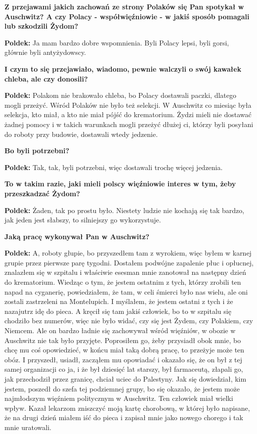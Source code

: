 \begin{otherlanguage}{polish}
\sloppy 
\textbf{Z przejawami jakich zachowań ze strony Polaków się Pan spotykał w Auschwitz? A czy Polacy - współwięźniowie - w jakiś sposób pomagali lub szkodzili Żydom?}

\textbf{Poldek:} Ja mam bardzo dobre wspomnienia. Byli Polacy lepsi, byli gorsi, głównie byli antyżydowscy.

\textbf{I czym to się przejawiało, wiadomo, pewnie walczyli o swój kawałek chleba, ale czy donosili?}
  
\textbf{Poldek:} Polakom nie brakowało chleba, bo Polacy dostawali paczki, dlatego mogli przeżyć. Wśród Polaków nie było też selekcji. W Auschwitz co miesiąc była selekcja, kto miał, a kto nie miał pójść do krematorium. Żydzi mieli nie dostawać żadnej pomocy i w takich warunkach mogli przeżyć dłużej ci, którzy byli posyłani do roboty przy budowie, dostawali wtedy jedzenie.

\textbf{Bo byli potrzebni?}

\textbf{Poldek:} Tak, tak, byli potrzebni, więc dostawali trochę więcej jedzenia. 

\textbf{To w takim razie, jaki mieli polscy więźniowie interes w tym, żeby przeszkadzać Żydom?}

\textbf{Poldek:} Żaden, tak po prostu było. Niestety ludzie nie kochają się tak bardzo, jak jeden jest słabszy, to silniejszy go wykorzystuje.

\textbf{Jaką pracę wykonywał Pan w Auschwitz?}
 
\textbf{Poldek:} A, roboty głupie, bo przyszedłem tam z wyrokiem, więc byłem w karnej grupie przez pierwsze parę tygodni. Dostałem podwójne zapalenie płuc i opłucnej, znalazłem się w szpitalu i właściwie esesman mnie zanotował na następny dzień do krematorium. Wiedząc o tym, że jestem ostatnim z tych, którzy zrobili ten napad na cyganerię, powiedziałem, że tam, w celi śmierci było nas wielu, ale oni zostali zastrzeleni na Montelupich. I myślałem, że jestem ostatni z tych i że nazajutrz idę do pieca. A kręcił się tam jakiś człowiek, bo to w szpitalu się chodziło bez numerów, więc nie było widać, czy się jest Żydem, czy Polakiem, czy Niemcem. Ale on bardzo ładnie się zachowywał wśród więźniów, w obozie w Auschwitz nie tak było przyjęte. Poprosiłem go, żeby przysiadł obok mnie, bo chcę mu coś opowiedzieć, w końcu miał taką dobrą pracę, to przeżyje może ten obóz. I przyszedł, usiadł, zacząłem mu opowiadać i okazało się, że on był z tej samej organizacji co ja, i że był dziesięć lat starszy, był farmaceutą, złapali go, jak przechodził przez granicę, chciał uciec do Palestyny. Jak się dowiedział, kim jestem, poszedł do szefa tej podziemnej grupy, bo się okazało, że jestem może najmłodszym więźniem politycznym w Auschwitz. Ten człowiek miał wielki wpływ. Kazał lekarzom zniszczyć moją kartę chorobową, w której było napisane, że na drugi dzień miałem iść do pieca i zapisał mnie jako nowego chorego i tak mnie uratowali. 
  

\end{otherlanguage}
